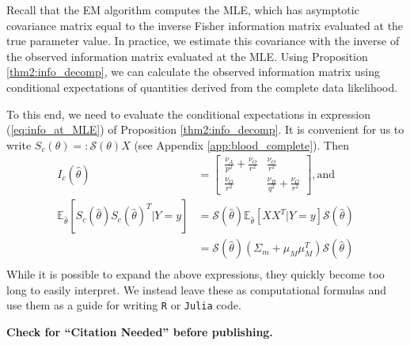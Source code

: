 \documentclass[11pt, oneside]{article}   	%
\newcommand{\bE}{\mathbb{E}}
\begin{document}
\begin{appendices}
    Recall that the EM algorithm computes the MLE, which has asymptotic covariance matrix equal to the inverse Fisher information matrix evaluated at the true parameter value. In practice, we estimate this covariance with the inverse of the observed information matrix evaluated at the MLE. Using Proposition \ref{thm2:info_decomp}, we can calculate the observed information matrix using conditional expectations of quantities derived from the complete data likelihood. 
    
    To this end, we need to evaluate the conditional expectations in expression (\ref{eq:info_at_MLE}) of Proposition \ref{thm2:info_decomp}. It is convenient for us to write $S_c(\theta) =: \mathscr{S}(\theta) X$ (see Appendix \ref{app:blood_complete}). Then 
    \begin{align}
        I_c(\hat{\theta}) &= \begin{bmatrix}
            \frac{\nu_A}{p^2} + \frac{\nu_O}{r^2} & \frac{\nu_O}{r^2}\\
            \frac{\nu_O}{r^2} & \frac{\nu_B}{q^2} + \frac{\nu_O}{r^2}
        \end{bmatrix} \mathrm{, and}\\
        \bE_{\hat{\theta}} [ S_c(\hat{\theta}) S_c(\hat{\theta})^T | Y=y] &= \mathscr{S}(\hat{\theta}) \bE_{\hat{\theta}} \left[ X X^T | Y=y \right] \mathscr{S}(\hat{\theta}) \\
        &= \mathscr{S}(\hat{\theta}) (\Sigma_m + \mu_M \mu_M^T) \mathscr{S}(\hat{\theta})\\
    \end{align}
    While it is possible to expand the above expressions, they quickly become too long to easily interpret. We instead leave these as computational formulas and use them as a guide for writing \texttt{R} or \texttt{Julia} code.

\end{appendices}

\newpage

\textbf{Check for ``Citation Needed'' before publishing.}




\printindex
\end{document}
